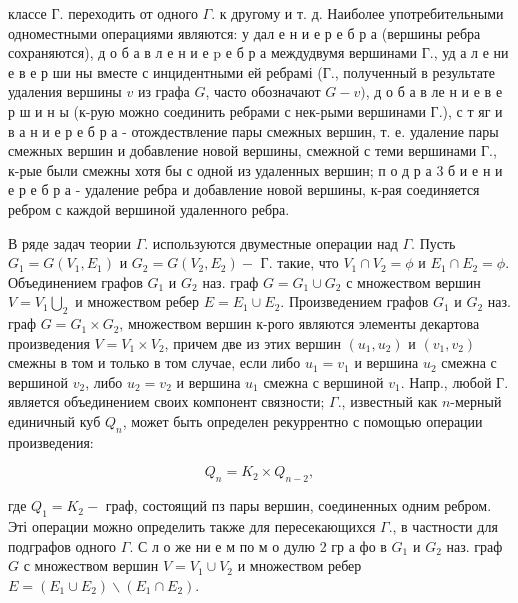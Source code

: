 \documentclass[10pt]{article}
\begin{document}
классе $Г$. переходить от одного $\Gamma$. к другому и т. д. Наиболее употребительными одноместными операциями являются: у дал е н и е р е б р а (вершины ребра сохраняются), д о б а в л е н и е $\mathrm{p}$ е б р а междудвумя вершинами Г., уд а л е ни е в е р ши ны вместе с инцидентными ей ребрамі (Г., полученный в результате удаления вершины $v$ из графа $G$, часто обозначают $G-v)$, д о б а в ле н и е в е р ш и н ы (к-рую можно соединить ребрами с нек-рыми вершинами Г.), с т яг и в а н и е р е б р а - отождествление пары смежных вершин, т. е. удаление пары смежных вершин и добавление новой вершины, смежной с теми вершинами Г., к-рые были смежны хотя бы с одной из удаленных вершин; п о д р а 3 б и е н и е р е б р а - удаление ребра и добавление новой вершины, к-рая соединяется ребром с каждой вершиной удаленного ребра.



В ряде задач теории $\Gamma$. используются двуместные операции над $\Gamma$. Пусть $G_{1}=G\left(V_{1}, E_{1}\right)$ и $G_{2}=G\left(V_{2}, E_{2}\right)-$ Г. такие, что $V_{1} \cap V_{2}=\phi$ и $E_{1} \cap E_{2}=\phi$. Объединением графов $G_{1}$ и $G_{2}$ наз. граф $G=G_{1} \cup G_{2}$ с множеством вершин $V=V_{1} \bigcup_{2}$ и множеством ребер $E=E_{1} \cup E_{2}$. Произведением графов $G_{1}$ и $G_{2}$ наз. граф $G=G_{1} \times G_{2}$, множеством вершин к-рого являются элементы декартова произведения $V=V_{1} \times V_{2}$, причем две из этих вершин $\left(u_{1}, u_{2}\right)$ и $\left(v_{1}, v_{2}\right)$ смежны в том и только в том случае, если либо $u_{1}=v_{1}$ и вершина $u_{2}$ смежна с вершиной $v_{2}$, либо $u_{2}=v_{2}$ и вершина $u_{1}$ смежна с вершиной $v_{1}$. Напр., любой Г. является объединением своих компонент связности; $\Gamma$., известный как $n$-мерный единичный куб $Q_{n}$, может быть определен рекуррентно с помощью операции произведения:



\[

Q_{n}=K_{2} \times Q_{n-2},

\]



где $Q_{1}=K_{2}-$ граф, состоящий пз пары вершин, соединенных одним ребром. Эті операции можно определить также для пересекающихся $\Gamma$., в частности для подграфов одного $\Gamma$. С л о же ни е м по м о дулю 2 гр а фо в $G_{1}$ и $G_{2}$ наз. граф $G$ с множеством вершин $V=V_{1} \cup V_{2}$ и множеством ребер $E=\left(E_{1} \cup E_{2}\right) \backslash\left(E_{1} \cap E_{2}\right)$.
\end{document}
